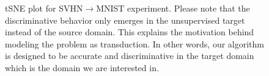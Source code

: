 \begin{figure}[ht]
\caption{tSNE plot for SVHN$\rightarrow$MNIST experiment. Please note that the discriminative behavior only emerges in the unsupervised target instead of the source domain. This explains the motivation behind modeling the problem as transduction. In other words, our algorithm is designed to be accurate and discriminative in the target domain which is the domain we are interested in.  }
\label{fig:tsnedigit}
\end{figure}
